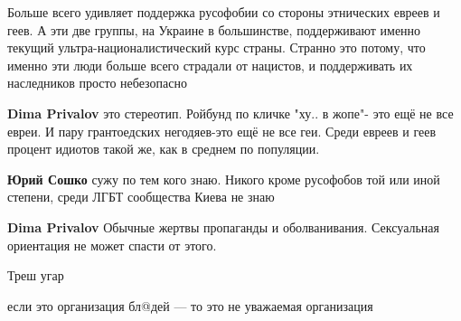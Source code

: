 \begin{itemize}
Больше всего удивляет поддержка русофобии со стороны этнических евреев и геев.
А эти две группы, на Украине в большинстве, поддерживают именно текущий
ультра-националистический курс страны. Странно это потому, что именно эти люди
больше всего страдали от нацистов, и поддерживать их наследников просто
небезопасно

\begin{itemize}
 
\textbf{Dima Privalov} это стереотип. Ройбунд по кличке "ху.. в жопе"- это ещё не все евреи. И пару грантоедских негодяев-это ещё не все геи. Среди евреев и геев процент идиотов такой же, как в среднем по популяции.

 
\textbf{Юрий Сошко} сужу по тем кого знаю. Никого кроме русофобов той или иной степени, среди ЛГБТ сообщества Киева не знаю

 
\textbf{Dima Privalov}
Обычные жертвы пропаганды и оболванивания. Сексуальная ориентация не может спасти от этого.
\end{itemize}

 
Треш угар

 
если это организация бл@дей — то это не уважаемая организация \Smiley[1.0][yellow]


\end{itemize}
